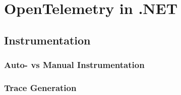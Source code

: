\chapter{OpenTelemetry in .NET}
\label{chap:dotnet}

\section{Instrumentation}
\label{sec:d_instrumentation}

\subsection{Auto- vs Manual Instrumentation}

\subsection{Trace Generation}
\label{sec:d_trace_generation}